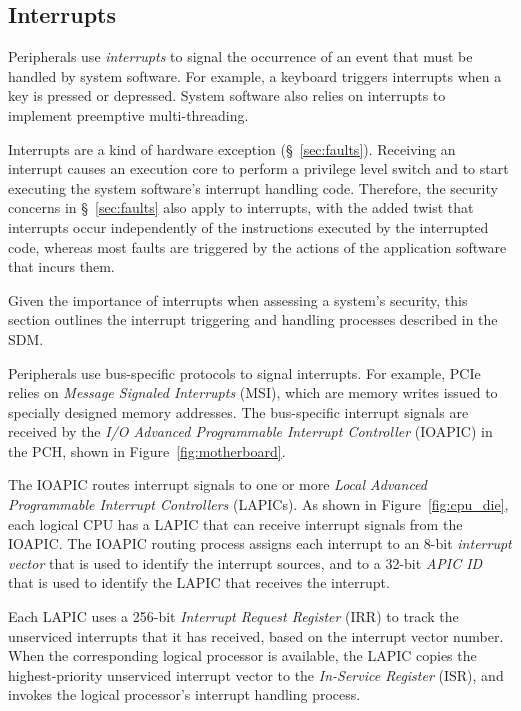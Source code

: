 \subsection{Interrupts}
\label{sec:interrupts}

Peripherals use \textit{interrupts} to signal the occurrence of an event that
must be handled by system software. For example, a keyboard triggers interrupts
when a key is pressed or depressed. System software also relies on interrupts
to implement preemptive multi-threading.

Interrupts are a kind of hardware exception (\S~\ref{sec:faults}). Receiving an
interrupt causes an execution core to perform a privilege level switch and to
start executing the system software's interrupt handling code. Therefore, the
security concerns in \S~\ref{sec:faults} also apply to interrupts, with the
added twist that interrupts occur independently of the instructions executed by
the interrupted code, whereas most faults are triggered by the actions of the
application software that incurs them.

Given the importance of interrupts when assessing a system's security, this
section outlines the interrupt triggering and handling processes described
in the SDM.


Peripherals use bus-specific protocols to signal interrupts. For example, PCIe
relies on \textit{Message Signaled Interrupts} (MSI), which are memory writes
issued to specially designed memory addresses. The bus-specific interrupt
signals are received by the \textit{I/O Advanced Programmable Interrupt
Controller} (IOAPIC) in the PCH, shown in Figure~\ref{fig:motherboard}.


The IOAPIC routes interrupt signals to one or more \textit{Local Advanced
Programmable Interrupt Controllers} (LAPICs). As shown in
Figure~\ref{fig:cpu_die}, each logical CPU has a LAPIC that can receive
interrupt signals from the IOAPIC. The IOAPIC routing process assigns each
interrupt to an 8-bit \textit{interrupt vector} that is used to identify the
interrupt sources, and to a 32-bit \textit{APIC ID} that is used to identify
the LAPIC that receives the interrupt.


Each LAPIC uses a 256-bit \textit{Interrupt Request Register} (IRR) to track
the unserviced interrupts that it has received, based on the interrupt vector
number. When the corresponding logical processor is available, the LAPIC copies
the highest-priority unserviced interrupt vector to the
\textit{In-Service Register} (ISR), and invokes the logical processor's
interrupt handling process.

